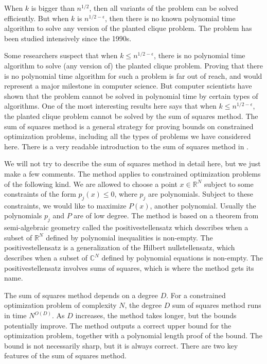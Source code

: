 \documentclass{amsart}
\newcommand{\CC}{\mathbb{C}}
\newcommand{\RR}{\mathbb{R}}
\begin{document}
When $k$ is bigger than $n^{1/2}$, then all variants of the problem can be solved efficiently.  But when $k$ is $n^{1/2 - \epsilon}$, then there is no known polynomial time algorithm to solve any version of the planted clique problem.  The problem has been studied intensively since the 1990s.  

Some researchers suspect that when $k \le n^{1/2 - \epsilon}$, there is no polynomial time algorithm to solve (any version of) the planted clique problem.  Proving that there is no polynomial time algorithm for such a problem is far out of reach, and would represent a major milestone in computer science.   But computer scientists have shown that the problem cannot be solved in polynomial time by certain types of algorithms.   One of the most interesting results here says that when $k \le n^{1/2 - \epsilon}$,  the planted clique problem cannot be solved by the sum of squares method.  
The sum of squares method is a general strategy for proving bounds on constrained optimization problems, including all the types of problems we have considered here.  There is a very readable introduction to the sum of squares method in \cite{BS}.  

We will not try to describe the sum of squares method in detail here, but we just make a few comments.  The method applies to constrained optimization problems of the following kind.  We are allowed to choose a point $x \in \RR^N$ subject to some constraints of the form $p_j(x) \le 0$, where $p_j$ are polynomials.  Subject to these constraints, we would like to maximize $P(x)$, another polynomial.  Usually the polynomials $p_j$ and $P$ are of low degree.  The method is based on a theorem from semi-algebraic geometry called the positivestellensatz which describes when a subset of $\RR^N$ defined by polynomial inequalities is non-empty.  The positivestellensatz is a generalization of the Hilbert nullstellensatz, which describes when a subset of $\CC^N$ defined by polynomial equations is non-empty.  The positivestellensatz involves sums of squares, which is where the method gets its name.

The sum of squares method depends on a degree $D$.  For a constrained optimization problem of complexity $N$, the degree $D$ sum of squares method runs in time $N^{O(D)}$.  As $D$ increases, the method takes longer, but the bounds potentially improve.  The method outputs a correct upper bound for the optimization problem, together with a polynomial length proof of the bound.  The bound is not necessarily sharp, but it is always correct.  There are two key features of the sum of squares method.
\end{document}
